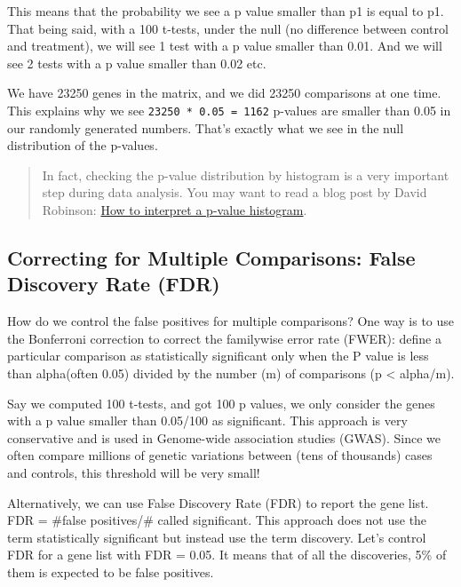 \documentclass[
]{book}
\begin{document}
This means that the probability we see a p value smaller than p1 is equal to p1. That being said, with a 100 t-tests, under the null (no difference between control and treatment), we will see 1 test with a p value smaller than 0.01. And we will see 2 tests with a p value smaller than 0.02 etc.

We have 23250 genes in the matrix, and we did 23250 comparisons at one time. This explains why we see \texttt{23250\ *\ 0.05\ =\ 1162} p-values are smaller than 0.05 in our randomly generated numbers. That's exactly what we see in the null distribution of the p-values.

\begin{quote}
In fact, checking the p-value distribution by histogram is a very important step during data analysis. You may want to read a blog post by David Robinson: \href{http://varianceexplained.org/statistics/interpreting-pvalue-histogram/}{How to interpret a p-value histogram}.
\end{quote}

\hypertarget{correcting-for-multiple-comparisons-false-discovery-rate-fdr}{%
\subsection{Correcting for Multiple Comparisons: False Discovery Rate (FDR)}\label{correcting-for-multiple-comparisons-false-discovery-rate-fdr}}

How do we control the false positives for multiple comparisons? One way is to use the Bonferroni correction to correct the familywise error rate (FWER): define a particular comparison as statistically significant only when the P value is less than alpha(often 0.05) divided by the number (m) of comparisons (p \textless{} alpha/m).

Say we computed 100 t-tests, and got 100 p values, we only consider the genes with a p value smaller than 0.05/100 as significant. This approach is very conservative and is used in Genome-wide association studies (GWAS). Since we often compare millions of genetic variations between (tens of thousands) cases and controls, this threshold will be very small!

Alternatively, we can use False Discovery Rate (FDR) to report the gene list. FDR = \#false positives/\# called significant. This approach does not use the term statistically significant but instead use the term discovery. Let's control FDR for a gene list with FDR = 0.05. It means that of all the discoveries, 5\% of them is expected to be false positives.
\end{document}
